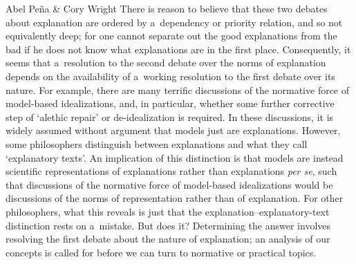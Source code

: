 \begin{editorialeng}{Abel Peña \& Cory Wright}
There is reason to believe that these two debates about explanation are ordered by a~dependency or priority relation, and so not equivalently deep; for one cannot separate out the good explanations from the bad if he does not know what explanations are in the first place. Consequently, it seems that a~resolution to the second debate over the norms of explanation depends on the availability of a~working resolution to the first debate over its nature. For example, there are many terrific discussions of the normative force of model-based idealizations, and, in particular, whether some further corrective step of `alethic repair' or de-idealization is required. In these discussions, it is widely assumed without argument that models just are explanations. However, some philosophers distinguish between explanations and what they call `explanatory texts'. An implication of this distinction is that models are instead scientific representations of explanations rather than explanations \textit{per se}, such that discussions of the normative force of model-based idealizations would be discussions of the norms of representation rather than of explanation. For other philosophers, what this reveals is just that the explanation–explanatory-text distinction rests on a~mistake. But does it? Determining the answer involves resolving the first debate about the nature of explanation; an analysis of our concepts is called for before we can turn to normative or practical topics.


\end{editorialeng}

